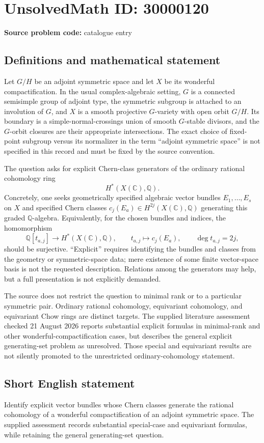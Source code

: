\documentclass[11pt]{article}
\newcommand{\Q}{\mathbb{Q}}
\newcommand{\C}{\mathbb{C}}
\begin{document}
\section*{UnsolvedMath ID: 30000120}
\textbf{Source problem code:} catalogue entry
\subsection{Definitions and mathematical statement}
Let $G/H$ be an adjoint symmetric space and let $X$ be its wonderful compactification. In the usual complex-algebraic setting, $G$ is a connected semisimple group of adjoint type, the symmetric subgroup is attached to an involution of $G$, and $X$ is a smooth projective $G$-variety with open orbit $G/H$. Its boundary is a simple-normal-crossings union of smooth $G$-stable divisors, and the $G$-orbit closures are their appropriate intersections. The exact choice of fixed-point subgroup versus its normalizer in the term ``adjoint symmetric space'' is not specified in this record and must be fixed by the source convention.

The question asks for explicit Chern-class generators of the ordinary rational cohomology ring
\[
 H^*(X(\C),\Q).
\]
Concretely, one seeks geometrically specified algebraic vector bundles $E_1,\ldots,E_s$ on $X$ and specified Chern classes $c_j(E_a)\in H^{2j}(X(\C),\Q)$ generating this graded $\Q$-algebra. Equivalently, for the chosen bundles and indices, the homomorphism
\[
 \Q[t_{a,j}]\longrightarrow H^*(X(\C),\Q),
 \qquad t_{a,j}\longmapsto c_j(E_a),\qquad \deg t_{a,j}=2j,
\]
should be surjective. ``Explicit'' requires identifying the bundles and classes from the geometry or symmetric-space data; mere existence of some finite vector-space basis is not the requested description. Relations among the generators may help, but a full presentation is not explicitly demanded.

The source does not restrict the question to minimal rank or to a particular symmetric pair. Ordinary rational cohomology, equivariant cohomology, and equivariant Chow rings are distinct targets. The supplied literature assessment checked 21 August 2026 reports substantial explicit formulas in minimal-rank and other wonderful-compactification cases, but describes the general explicit generating-set problem as unresolved. Those special and equivariant results are not silently promoted to the unrestricted ordinary-cohomology statement.
\subsection{Short English statement}
Identify explicit vector bundles whose Chern classes generate the rational cohomology of a wonderful compactification of an adjoint symmetric space. The supplied assessment records substantial special-case and equivariant formulas, while retaining the general generating-set question.
\end{document}
